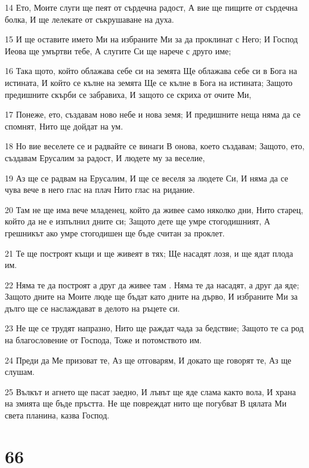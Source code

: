 \par 14 Ето, Моите слуги ще пеят от сърдечна радост, А вие ще пищите от сърдечна болка, И ще лелекате от съкрушаване на духа.
\par 15 И ще оставите името Ми на избраните Ми за да проклинат с Него; И Господ Иеова ще умъртви тебе, А слугите Си ще нарече с друго име;
\par 16 Така щото, който облажава себе си на земята Ще облажава себе си в Бога на истината, И който се кълне на земята Ще се кълне в Бога на истината; Защото предишните скърби се забравиха, И защото се скриха от очите Ми,
\par 17 Понеже, ето, създавам ново небе и нова земя; И предишните неща няма да се спомнят, Нито ще дойдат на ум.
\par 18 Но вие веселете се и радвайте се винаги В онова, което създавам; Защото, ето, създавам Ерусалим за радост, И людете му за веселие,
\par 19 Аз ще се радвам на Ерусалим, И ще се веселя за людете Си, И няма да се чува вече в него глас на плач Нито глас на ридание.
\par 20 Там не ще има вече младенец, който да живее само няколко дни, Нито старец, който да не е изпълнил дните си; Защото дете ще умре стогодишният, А грешникът ако умре стогодишен ще бъде считан за проклет.
\par 21 Те ще построят къщи и ще живеят в тях; Ще насадят лозя, и ще ядат плода им.
\par 22 Няма те да построят а друг да живее там . Няма те да насадят, а друг да яде; Защото дните на Моите люде ще бъдат като дните на дърво, И избраните Ми за дълго ще се наслаждават в делото на ръцете си.
\par 23 Не ще се трудят напразно, Нито ще раждат чада за бедствие; Защото те са род на благословение от Господа, Тоже и потомството им.
\par 24 Преди да Ме призоват те, Аз ще отговарям, И докато ще говорят те, Аз ще слушам.
\par 25 Вълкът и агнето ще пасат заедно, И лъвът ще яде слама както вола, И храна на змията ще бъде пръстта. Не ще повреждат нито ще погубват В цялата Ми света планина, казва Господ.

\chapter{66}

